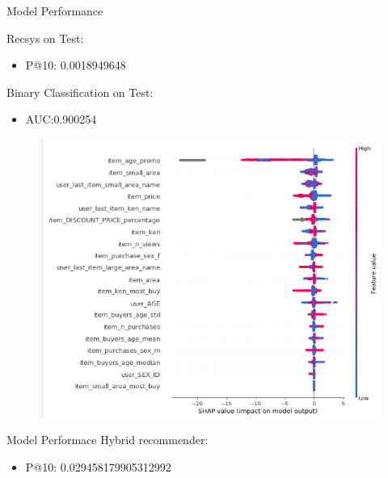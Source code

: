 \documentclass{beamer}
\begin{document}
\begin{frame}{Model Performance}

	Recsys on Test:
	\begin{itemize}
		\item P@10: 0.0018949648 
	\end{itemize}
	 
	Binary Classification on Test: 
		\begin{itemize}
			\item AUC:0.900254
		\end{itemize}
	
	\begin{figure}
	\centering
	\includegraphics[width=0.7\linewidth]{../img/shap}
	\label{fig:shap}
	\end{figure}
\end{frame}

\begin{frame}{Model Performace}
	Hybrid recommender:

	\begin{itemize}
		\item P@10: 0.029458179905312992
	\end{itemize}
	
\end{frame}
	
\end{document}
